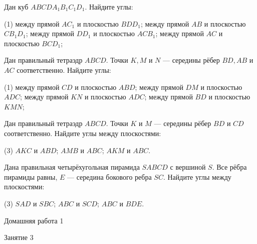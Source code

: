 \begin{class}[number=2]
	\begin{listofex}
		\item Дан куб \(ABCDA_1B_1C_1D_1\). Найдите углы:
		\begin{tasks}(1)
			\task между прямой \( AC_1 \) и плоскостью \(BDD_1 \);
			\task между прямой \(  AB\) и плоскостью \( CB_1D_1\);
			\task между прямой \( DD_1 \) и плоскостью \( ACB_1\);
			\task между прямой \( AC \) и плоскостью \( BCD_1\);
		\end{tasks}
		\item Дан правильный тетраэдр \(ABCD\). Точки \(K, M\) и \(N\) --- середины рёбер \(BD, AB\) и \(AC\) соответственно. Найдите углы:
		\begin{tasks}(1)
			\task между прямой \( CD \) и плоскостью \(ABD \);
			\task между прямой \(  DM\) и плоскостью \( ADC \);
			\task между прямой \( KN \) и плоскостью \( ADC\);
			\task между прямой \( BD \) и плоскостью \( KMN\);
		\end{tasks}
		\item Дан правильный тетраэдр \(ABCD\). Точки \(K\) и \(M\) --- середины рёбер \(BD\) и \(CD\) соответственно. Найдите углы между плоскостями:
		\begin{tasks}(3)
			\task \( AKC \) и \( ABD \);
			\task \( AMB \) и \( ABC \);
			\task \( AKM \) и \( ABC \).
		\end{tasks}
		\item Дана правильная четырёхугольная пирамида \(SABCD\) с вершиной \(S\). Все рёбра пирамиды равны, \(E\) --- середина бокового ребра \(SC\). Найдите углы между плоскостями:
		\begin{tasks}(3)
			\task \( SAD \) и \( SBC \);
			\task \( ABC \) и \( SCD \);
			\task \( ABC \) и \( BDE \).
		\end{tasks}
	\end{listofex}
\end{class}

\begin{homework}[number=1]
	\begin{listofex}
		\item Домашняя работа 1
	\end{listofex}
\end{homework}

\begin{class}[number=3]
	\begin{listofex}
		\item Занятие 3 
	\end{listofex}
\end{class}

